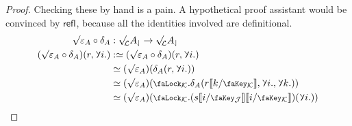 \documentclass[10pt]{article}
\theoremstyle{definition}
\let\oldequiv\equiv%
\renewcommand{\equiv}{\simeq}
\newcommand{\defeq}{\oldequiv}
\newcommand*{\refl}[1]{\mathsf{refl}_{#1}}
\newcommand{\lock}{\mathchoice {\scalebox{0.8}{\text{\faLock}}}
  {\scalebox{0.8}{\text{\faLock}}} {\scalebox{0.5}{\text{\faLock}}}
  {\scalebox{0.4}{\text{\faLock}}} }
\newcommand{\key}{\mathchoice
  {\scalebox{0.8}{\text{\faKey}}} {\scalebox{0.8}{\text{\faKey}}}
  {\scalebox{0.5}{\text{\faKey}}} {\scalebox{0.4}{\text{\faKey}}} }
\newcommand{\rbindsym}{\raisebox{-0.5pt}{\scalerel*{\reflectbox{\rotatebox[origin=c]{185}{$\lambda$}}}{\lambda}}}
\newcommand{\rbind}[1]{\rbindsym{} #1.}
\newcommand{\lockn}[1]{\mathcal{#1}}
\newcommand{\stubra}[1]{\llbracket #1 \rrbracket}
\newcommand{\substucke}[2]{\stubra{#1/\key_{#2}}}
\newcommand{\substuck}[2]{\substucke{#1}{\lockn{#2}}}
\newcommand{\rforme}[2]{\ThisStyle{\raisebox{0.07em}{$\SavedStyle \surd_{\hspace{-0.25em}#1}$}} #2}
\newcommand{\rform}[2]{\rforme{\lockn{#1}}{#2}}
\newcommand{\rformu}[1]{\ThisStyle{\raisebox{0.07em}{$\SavedStyle \surd$}} #1}
\newcommand{\rintroe}[2]{\lock_{#1}. #2}
\newcommand{\rintro}[2]{\rintroe{\lockn{#1}}{#2}}
\newcommand{\rget}[1]{{#1}_{\downharpoonleft}}
\begin{document}
\begin{proof}
  Checking these by hand is a pain. A hypothetical proof assistant
  would be convinced by $\refl{}$, because all the identities involved
  are definitional.
  \begin{align*}
    \rformu \varepsilon_A \circ \delta_A
    &: \rform{L} \rget{A} \to \rform{L} \rget{A} \\
    (\rformu \varepsilon_A \circ \delta_A)(r, \rbind{i})
    &:\defeq (\rformu \varepsilon_A \circ \delta_A)(r, \rbind{i}) \\
    &\defeq (\rformu \varepsilon_A)(\delta_A(r, \rbind{i})) \\
    &\defeq (\rformu \varepsilon_A)(\rintro{K}{\delta_A(r\substuck{k}{K}, \rbind{i}, \rbind{k})}) \\
    &\defeq (\rformu \varepsilon_A)(\rintro{K}{(s\substuck{i}{J}\substuck{i}{K})(\rbind{i})}) \\
  \end{align*}


\end{proof}
\end{document}
